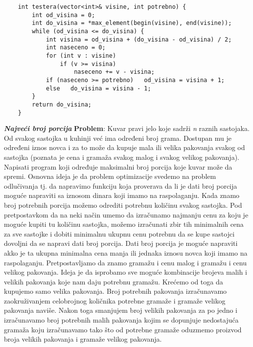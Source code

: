 \documentclass{article}
\begin{document}
\begin{lstlisting}
    int testera(vector<int>& visine, int potrebno) {
        int od_visina = 0;
        int do_visina = *max_element(begin(visine), end(visine));
        while (od_visina <= do_visina) {
            int visina = od_visina + (do_visina - od_visina) / 2;
            int naseceno = 0;
            for (int v : visine)
                if (v >= visina)
                    naseceno += v - visina;
            if (naseceno >= potrebno)   od_visina = visina + 1;
            else   do_visina = visina - 1;
        }
        return do_visina;
    }
\end{lstlisting}
\textit{\textbf{Najveći broj porcija}}
\vspace{0.1cm}\newline
\textbf{Problem}: Kuvar pravi jelo koje sadrži \textit{n} raznih sastojaka. Od svakog sastojka
u kuhinji već ima određeni broj grama. Dostupan mu je određeni iznos novca i
za to može da kupuje mala ili velika pakovanja svakog od sastojka (poznata je
cena i gramaža svakog malog i svakog velikog pakovanja). Napisati program koji
određuje maksimalni broj porcija koje kuvar može da spremi.
\newline
Osnovna ideja je da problem optimizacije svedemo na problem odlučivanja tj.
da napravimo funkciju koja proverava da li je dati broj porcija moguće napraviti
sa iznosom dinara koji imamo na raspolaganju. Kada znamo broj potrebnih
porcija možemo odrediti potrebnu količinu svakog sastojka. Pod pretpostavkom da na neki
način umemo da izračunamo najmanju cenu za koju je moguće kupiti tu količinu
sastojka, možemo izračunati zbir tih
minimalnih cena za sve sastojke i dobiti minimalnu ukupnu cenu potrebnu da
se kupe sastojci dovoljni da se napravi dati broj porcija. Dati broj porcija je
moguće napraviti akko je ta ukupna minimalna cena manja ili jednaka
iznosu novca koji imamo na raspolaganju.
\newline
Pretpostavljamo da znamo gramažu i cenu malog i gramažu
i cenu velikog pakovanja. Ideja je da
isprobamo sve moguće kombinacije brojeva malih i velikih pakovanja koje nam
daju potrebnu gramažu. Krećemo od toga da kupujemo samo velika pakovanja.
Broj potrebnih pakovanja izračunavamo zaokruživanjem celobrojnog količnika
potrebne gramaže i gramaže velikog pakovanja naviše. Nakon toga smanjujem
broj velikih pakovanja za po jedno i izračunavamo broj potrebnih malih pakovanja
kojim se dopunjuje nedostajuća gramaža koju izračunavamo tako što od potrebne
gramaže oduzmemo proizvod broja velikih pakovanja i gramaže velikog pakovanja.
\end{document}
